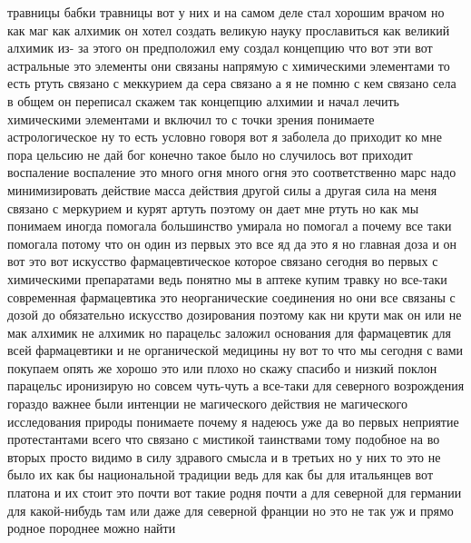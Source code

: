 травницы бабки травницы вот у них и на самом деле стал хорошим врачом но как маг
как алхимик он хотел создать великую науку прославиться как великий алхимик из-
за этого он предположил ему создал концепцию что вот эти вот астральные это
элементы они связаны напрямую с химическими элементами то есть ртуть связано с
меккурием да сера связано а я не помню с кем связано села в общем он переписал
скажем так концепцию алхимии и начал лечить химическими элементами и включил то
с точки зрения понимаете астрологическое ну то есть условно говоря вот я
заболела до приходит ко мне пора цельсию не дай бог конечно такое было но
случилось вот приходит воспаление воспаление это много огня много огня это
соответственно марс надо минимизировать действие масса действия другой силы а
другая сила на меня связано с меркурием и курят артуть поэтому он дает мне ртуть
но как мы понимаем иногда помогала большинство умирала но помогал а почему все
таки помогала потому что он один из первых это все яд да это я но главная доза и
он вот это вот искусство фармацевтическое которое связано сегодня во первых с
химическими препаратами ведь понятно мы в аптеке купим травку но все-таки
современная фармацевтика это неорганические соединения но они все связаны с
дозой до обязательно искусство дозирования поэтому как ни крути мак он или не
мак алхимик не алхимик но парацельс заложил основания для фармацевтик для всей
фармацевтики и не органической медицины ну вот то что мы сегодня с вами покупаем
опять же хорошо это или плохо но скажу спасибо и низкий поклон парацельс
иронизирую но совсем чуть-чуть а все-таки для северного возрождения гораздо
важнее были интенции не магического действия не магического исследования природы
понимаете почему я надеюсь уже да во первых неприятие протестантами всего что
связано с мистикой таинствами тому подобное на во вторых просто видимо в силу
здравого смысла и в третьих но у них то это не было их как бы национальной
традиции ведь для как бы для итальянцев вот платона и их стоит это почти вот
такие родня почти а для северной для германии для какой-нибудь там или даже для
северной франции но это не так уж и прямо родное породнее можно найти 

